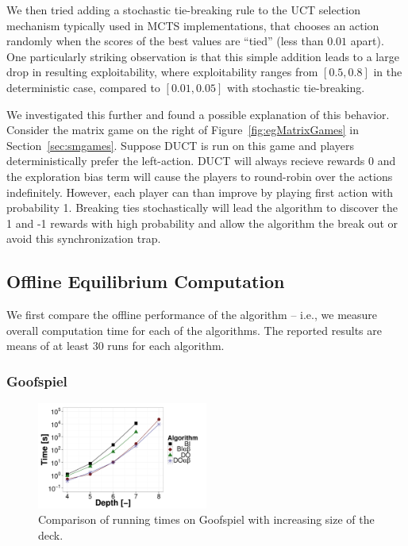We then tried adding a stochastic tie-breaking rule to the UCT selection mechanism typically used in MCTS implementations, that chooses an 
action randomly when the scores of the best values are ``tied'' (less than $0.01$ apart).
One particularly striking observation is that this simple addition leads to a large drop in resulting exploitability, where exploitability
ranges from $[0.5,0.8]$ in the deterministic case, compared to $[0.01,0.05]$ with stochastic tie-breaking. 

We investigated this further and found a possible
explanation of this behavior. Consider the matrix game on the right of Figure~\ref{fig:egMatrixGames} in Section~\ref{sec:smgames}.
Suppose DUCT is run on this game and players deterministically prefer the left-action. 
DUCT will always recieve rewards 0 and the exploration bias term will cause the players to round-robin over the actions indefinitely. 
However, each player can than improve by playing first action with probability 1. Breaking ties stochastically will lead the algorithm to 
discover the 1 and -1 rewards with high probability and allow the algorithm the break out or avoid this synchronization trap.

\subsection{Offline Equilibrium Computation}
We first compare the offline performance of the algorithm -- i.e., we measure overall computation time for each of the algorithms. 
The reported results are means of at least $30$ runs for each algorithm. 

\subsubsection{Goofspiel}
\begin{figure}
\centering
\includegraphics[width=0.5\textwidth]{figures/GS.pdf}
\caption{Comparison of running times on Goofspiel with increasing size of the deck.} \label{fig:off:res:gs}
\end{figure}

